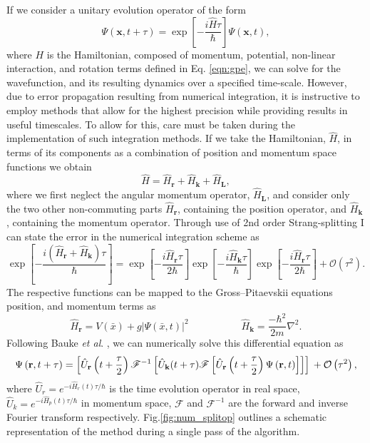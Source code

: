 If we consider a unitary evolution operator of the form
\begin{equation}\label{eqn:1}
\Psi(\mathbf{x},t+\tau) = \exp\left[ -\frac{i\hat{H}\tau}{\hbar}\right]\Psi(\mathbf{x},t),
\end{equation}
where $H$ is the Hamiltonian, composed of momentum, potential, non-linear interaction, and rotation terms defined in Eq. \eqref{eqn:gpe}, we can solve for the wavefunction, and its resulting dynamics over a specified time-scale. However, due to error propagation resulting from numerical integration, it is instructive to employ methods that allow for the highest precision while providing results in useful timescales. To allow for this, care must be taken during the implementation of such integration methods.  If we take the Hamiltonian, $\hat{H}$, in terms of its components as a combination of position and momentum space functions we obtain
\begin{equation}\label{eqn:2}
\hat{H} = \hat{H}_{\textbf{r}} + \hat{H}_{\textbf{k}} + \hat{H}_{\textbf{L}},
\end{equation}
where we first neglect the angular momentum operator, $\hat{H}_{\textbf{L}}$, and consider only the two other non-commuting parts $\hat{H}_{\textbf{r}}$, containing the position operator, and $\hat{H}_{\textbf{k}}$, containing the momentum operator. Through use of 2nd order Strang-splitting I can state the error in the numerical integration scheme as
\begin{equation}\label{eqn:3}
\exp\left[ -\frac{ i\left(\hat{H}_{\textbf{r}} + \hat{H}_{\textbf{k}}\right)\tau}{\hbar} \right] = \exp\left[- \frac{i\hat{H}_{\textbf{r}}\tau}{2\hbar} \right]\exp\left[-\frac{i\hat{H}_{\textbf{k}}\tau}{\hbar}\right]\exp\left[ -\frac{i\hat{H}_{\textbf{r}}\tau}{2\hbar}\right] + \mathcal{O}\left(\tau^2\right).
\end{equation}
The respective functions can be mapped to the Gross--Pitaevskii equations position, and momentum terms as
\begin{equation}
\hat{H}_{\textbf{r}} = V(\bar{x}) + g\vert\Psi(\bar{x},t)\vert^2\; \hspace{5em} \hat{H}_{\textbf{k}} = \frac{-\hbar^2}{2m}\nabla^2.
\end{equation}
Following Bauke \textit{et al}. \cite{Num:Bauke_cpc_2011}, we can numerically solve this differential equation as
\begin{equation}
\Psi\left(\textbf{r},t+\tau\right) = \left[\hat{U}_{\mathbf{r}}\left(t+\frac{\tau}{2}\right) \mathscr{F}^{-1} \left[ \hat{U}_{\mathbf{k}}(t+\tau) \mathscr{F} \left[ \hat{U}_{\mathbf{r}}\left(t+\frac{\tau}{2}\right) \Psi\left(\mathbf{r},t\right) \right] \right] \right]  \\ + \mathcal{O}\left(\tau^2\right),
\end{equation}
where $\hat{U}_{r}=e^{-i\hat{H}_{r}(t)\tau/\hbar}$ is the time evolution operator in real space, $\hat{U}_{k}=e^{-i\hat{H}_{p}(t)\tau/\hbar}$ in momentum space,  $\mathscr{F}$ and $\mathscr{F}^{-1}$ are the forward and inverse Fourier transform respectively. Fig.\ref{fig:num_splitop} outlines a schematic representation of the method during a single pass of the algorithm.

